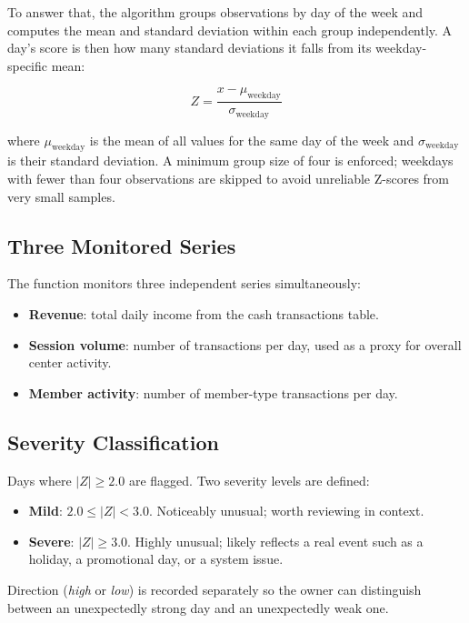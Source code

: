 \documentclass[12pt, a4paper]{report}
\begin{document}
To answer that, the algorithm groups observations by day of the week and computes
the mean and standard deviation within each group independently. A day's score is
then how many standard deviations it falls from its weekday-specific mean:

\[
  Z = \frac{x - \mu_{\text{weekday}}}{\sigma_{\text{weekday}}}
\]

where $\mu_{\text{weekday}}$ is the mean of all values for the same day of the
week and $\sigma_{\text{weekday}}$ is their standard deviation. A minimum group
size of four is enforced; weekdays with fewer than four observations are skipped
to avoid unreliable Z-scores from very small samples.

\subsection{Three Monitored Series}

The function monitors three independent series simultaneously:

\begin{itemize}
  \item \textbf{Revenue}: total daily income from the cash transactions table.
  \item \textbf{Session volume}: number of transactions per day, used as a proxy
        for overall center activity.
  \item \textbf{Member activity}: number of member-type transactions per day.
\end{itemize}

\subsection{Severity Classification}

Days where $|Z| \geq 2.0$ are flagged. Two severity levels are defined:

\begin{itemize}
  \item \textbf{Mild}: $2.0 \leq |Z| < 3.0$. Noticeably unusual; worth reviewing
        in context.
  \item \textbf{Severe}: $|Z| \geq 3.0$. Highly unusual; likely reflects a real
        event such as a holiday, a promotional day, or a system issue.
\end{itemize}

Direction (\textit{high} or \textit{low}) is recorded separately so the owner
can distinguish between an unexpectedly strong day and an unexpectedly weak one.
\end{document}
